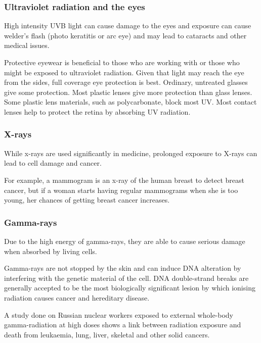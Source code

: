             \subsubsection*{Ultraviolet radiation and the eyes}
            \nopagebreak
        \label{m38779*id189581}High intensity UVB light can cause damage to the eyes and exposure can cause welder's flash (photo keratitis or arc eye) and may lead to cataracts and other medical issues.\par 
        \label{m38779*id189586}Protective eyewear is beneficial to those who are working with or those who might be exposed to ultraviolet radiation. Given that light may reach the eye from the sides, full coverage eye protection is best.
        \label{m38779*id189594}Ordinary, untreated glasses give some protection. Most plastic lenses give more protection than glass lenses. Some plastic lens materials, such as polycarbonate, block most UV. Most contact lenses help to protect the retina by absorbing UV radiation.\par 
      \label{m38779*uid22}
      \begin{minipage}{.5\textwidth}
            \subsubsection*{X-rays}
            \nopagebreak
        \label{m38779*id189613}While x-rays are used significantly in medicine, prolonged exposure to X-rays can lead to cell damage and cancer.\par 
        \label{m38779*id189617}For example, a mammogram is an x-ray of the human breast to detect breast cancer, but if a woman starts having regular mammograms when she is too young, her chances of getting breast cancer increases.\par 
      \label{m38779*uid23}
            \subsubsection*{Gamma-rays}
            \nopagebreak
        \label{m38779*id189632}Due to the high energy of gamma-rays, they are able to cause serious damage when absorbed by living cells.\par 
        \label{m38779*id189636}Gamma-rays are not stopped by the skin and can induce DNA alteration by interfering with the genetic material of the cell. DNA double-strand breaks are generally accepted to be the most biologically significant lesion by which ionising radiation causes cancer and hereditary disease.\par 
        \label{m38779*id189642}A study done on Russian nuclear workers exposed to external whole-body gamma-radiation at high doses shows a link between radiation exposure and death from leukaemia, lung, liver, skeletal and other solid cancers.\par 
      \label{m38779*eip-665}
\end{minipage}
